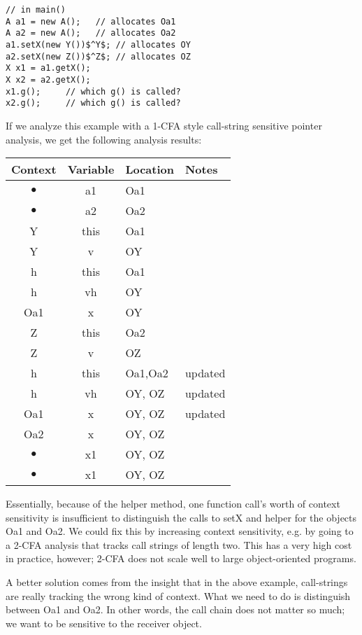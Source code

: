 \documentclass[11pt]{article}
\def\tablespace{\vspace{2ex}}
\begin{document}
\begin{sloppypar}
\begin{lstlisting}[mathescape]
// in main()
A a1 = new A();	  // allocates Oa1
A a2 = new A();   // allocates Oa2
a1.setX(new Y())$^Y$; // allocates OY
a2.setX(new Z())$^Z$; // allocates OZ
X x1 = a1.getX();
X x2 = a2.getX();
x1.g(); 	// which g() is called?
x2.g(); 	// which g() is called?
\end{lstlisting}

If we analyze this example with a 1-CFA style call-string sensitive pointer analysis, we get the following analysis results:

\tablespace
\begin{tabular}{c | c | l | l}

Context & Variable & Location & Notes\\
\hline
$\bullet$ & a1   & Oa1 \\
$\bullet$ & a2   & Oa2 \\
Y         & this & Oa1 \\
Y         & v    & OY  \\
h         & this & Oa1 \\
h         & vh   & OY  \\
Oa1       & x    & OY  \\
Z         & this & Oa2 \\
Z         & v    & OZ  \\
h         & this & Oa1,Oa2 & updated \\
h         & vh   & OY, OZ  & updated\\
Oa1       & x    & OY, OZ  & updated\\
Oa2       & x    & OY, OZ \\
$\bullet$ & x1   & OY, OZ \\
$\bullet$ & x1   & OY, OZ \\

\end{tabular}
\tablespace

Essentially, because of the helper method, one function call's worth of context sensitivity is insufficient to distinguish the calls to setX and helper for the objects Oa1 and Oa2.  We could fix this by increasing context sensitivity, e.g. by going to a 2-CFA analysis that tracks call strings of length two.  This has a very high cost in practice, however; 2-CFA does not scale well to large object-oriented programs.

A better solution comes from the insight that in the above example, call-strings are really tracking the wrong kind of context.  What we need to do is distinguish between Oa1 and Oa2.  In other words, the call chain does not matter so much; we want to be sensitive to the receiver object.


\end{sloppypar}
\end{document}
